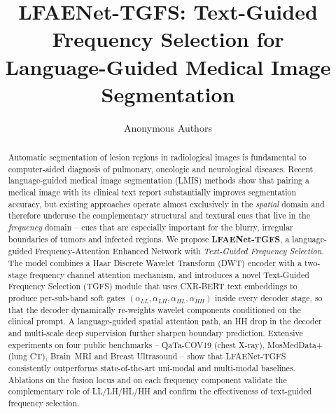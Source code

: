\documentclass[runningheads]{llncs}
\newcommand{\method}{LFAENet-TGFS\xspace}
\newcommand{\tgfs}{TGFS\xspace}
\begin{document}
\title{LFAENet-TGFS: Text-Guided Frequency Selection for\\
       Language-Guided Medical Image Segmentation}

\author{Anonymous Authors}

\maketitle

\begin{abstract}
Automatic segmentation of lesion regions in radiological images is
fundamental to computer-aided diagnosis of pulmonary, oncologic and
neurological diseases. Recent language-guided medical image
segmentation (LMIS) methods show that pairing a medical image with its
clinical text report substantially improves segmentation accuracy, but
existing approaches operate almost exclusively in the \emph{spatial}
domain and therefore underuse the complementary structural and
textural cues that live in the \emph{frequency} domain -- cues that
are especially important for the blurry, irregular boundaries of
tumors and infected regions. We propose
\textbf{\method}, a language-guided Frequency-Attention Enhanced
Network with \emph{Text-Guided Frequency Selection}. The model
combines a Haar Discrete Wavelet Transform (DWT) encoder with a
two-stage frequency channel attention mechanism, and introduces a
novel Text-Guided Frequency Selection (\tgfs) module that uses
CXR-BERT text embeddings to produce per-sub-band soft gates
$(\alpha_{LL},\alpha_{LH},\alpha_{HL},\alpha_{HH})$ inside every
decoder stage, so that the decoder dynamically re-weights wavelet
components conditioned on the clinical prompt.
A language-guided spatial attention path, an HH drop in the decoder
and multi-scale deep supervision further sharpen boundary prediction.
Extensive experiments on four public benchmarks -- QaTa-COV19
(chest X-ray), MosMedData+ (lung CT), Brain~MRI and Breast
Ultrasound -- show that \method consistently outperforms
state-of-the-art uni-modal and multi-modal baselines. Ablations on
the fusion locus and on each frequency component validate the
complementary role of LL/LH/HL/HH and confirm the effectiveness of
text-guided frequency selection.

\end{abstract}
\end{document}
